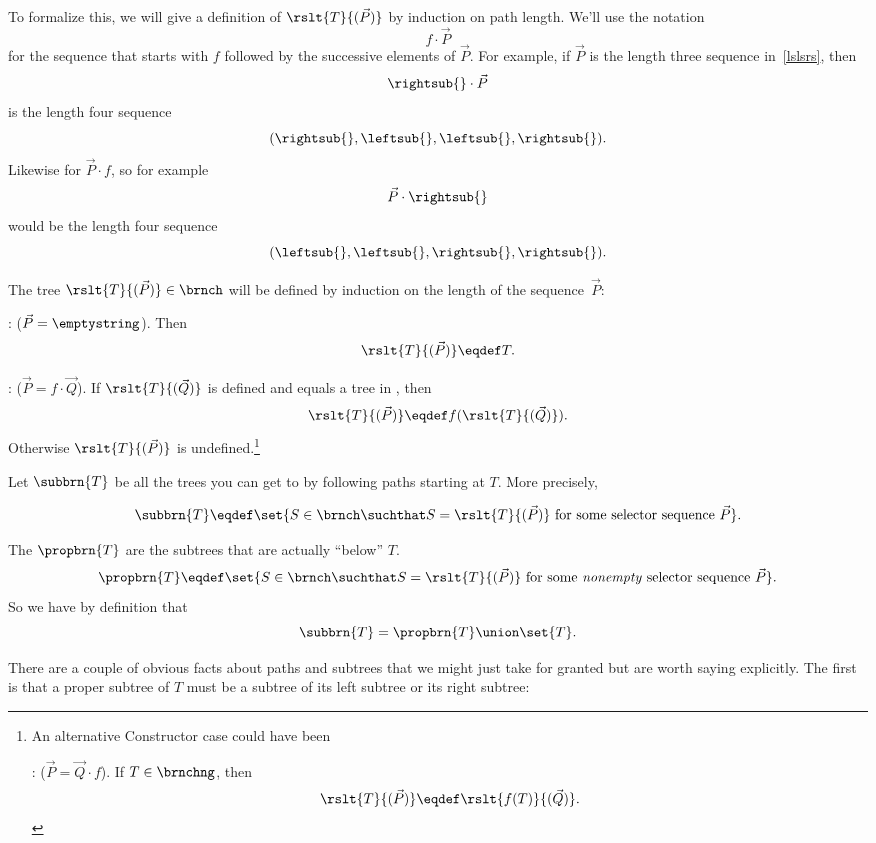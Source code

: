 \begin{definition}
To formalize this, we will give a definition of $\rslt{T}{(\vec{P})}$
by induction on path length.  We'll use the notation
\[
f \cdot \vec{P}
\]
for the sequence that starts with $f$ followed by the successive
elements of $\vec{P}$.  For example, if $\vec{P}$ is the length three
sequence in~\eqref{lslsrs}, then
\[
\rightsub{} \cdot \vec{P}
\]
is the length four sequence
\[
(\rightsub{}, \leftsub{},\leftsub{},\rightsub{}).
\]
Likewise for $\vec{P} \cdot f$, so for example
\[
 \vec{P} \cdot \rightsub{}
\]
would be the length four sequence
\[
(\leftsub{},\leftsub{},\rightsub{},\rightsub{}).
\]

\begin{definition}
The tree $\rslt{T}{(\vec{P})} \in \brnch$ will be defined by induction
on the length of the sequence~$\vec{P}$:

: ($\vec{P} = \emptystring$).
Then
\[
\rslt{T}{(\vec{P})} \eqdef T.
\]

: ($\vec{P} = f \cdot \vec{Q}$).  If
$\rslt{T}{(\vec{Q})}$ is defined and equals a tree in \brnchng, then
\[
\rslt{T}{(\vec{P})} \eqdef f(\rslt{T}{(\vec{Q})}).
\]
Otherwise $\rslt{T}{(\vec{P})}$ is undefined.\footnote{An alternative
  Constructor case could have been

: ($\vec{P} = \vec{Q} \cdot f$).  If
$T \in \brnchng$, then
\[
\rslt{T}{(\vec{P})} \eqdef \rslt{f(T)}{(\vec{Q})}.
\]}

\end{definition}
\medskip

Let $\subbrn{T}$ be all the trees you can get to by following paths
starting at $T$.  More precisely,
\begin{definition}\label{def:subtree}
\[
\subbrn{T} \eqdef \set{S \in \brnch \suchthat S =
  \rslt{T}{(\vec{P})}\ \text{for some selector sequence}\ \vec{P}}.
\]
\end{definition}

The  $\propbrn{T}$ are the subtrees that are
actually ``below'' $T$.
\[
\propbrn{T} \eqdef \set{S \in \brnch \suchthat S =
  \rslt{T}{(\vec{P})}\ \text{for some \emph{nonempty} selector
    sequence}\ \vec{P}}.
\]
So we have by definition that
\begin{equation}\label{subtree-proptree}
\subbrn{T} = \propbrn{T} \union \set{T}.
\end{equation}

There are a couple of obvious facts about paths and subtrees that we
might just take for granted but are worth saying explicitly.
The first is that a proper subtree of $T$ must be a subtree of its
left subtree or its right subtree:


\end{definition}

